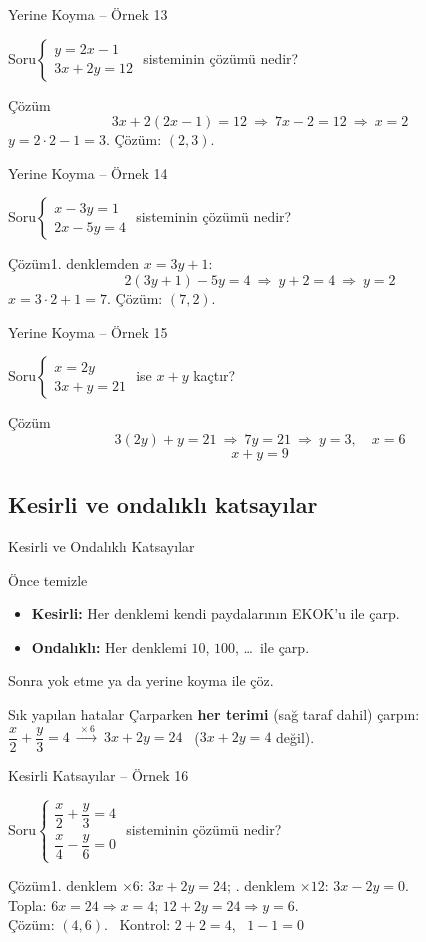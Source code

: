 \documentclass[aspectratio=169,11pt]{beamer}
\newcommand{\soru}[3]{%
\begin{frame}{#1}
  \begin{block}{Soru}\large #2\end{block}
  \pause
  \begin{exampleblock}{Çözüm}\large #3\end{exampleblock}
\end{frame}}
\begin{document}
\soru{Yerine Koyma -- Örnek 13}
{\(\begin{cases}y=2x-1\\ 3x+2y=12\end{cases}\) \quad sisteminin çözümü nedir?}
{\[3x+2(2x-1)=12\ \Rightarrow\ 7x-2=12\ \Rightarrow\ x=2\]
\(y=2\cdot 2-1=3\). \quad Çözüm: \((2,3)\).}

\soru{Yerine Koyma -- Örnek 14}
{\(\begin{cases}x-3y=1\\ 2x-5y=4\end{cases}\) \quad sisteminin çözümü nedir?}
{1. denklemden \(x=3y+1\):
\[2(3y+1)-5y=4\ \Rightarrow\ y+2=4\ \Rightarrow\ y=2\]
\(x=3\cdot 2+1=7\). \quad Çözüm: \((7,2)\).}

\soru{Yerine Koyma -- Örnek 15}
{\(\begin{cases}x=2y\\ 3x+y=21\end{cases}\) \quad ise \(x+y\) kaçtır?}
{\[3(2y)+y=21\ \Rightarrow\ 7y=21\ \Rightarrow\ y=3,\quad x=6\]
\[x+y=9\]}

\subsection{Kesirli ve ondalıklı katsayılar}
\begin{frame}{Kesirli ve Ondalıklı Katsayılar}
\begin{block}{Önce temizle}
\begin{itemize}
\item \textbf{Kesirli:} Her denklemi kendi paydalarının EKOK'u ile çarp.
\item \textbf{Ondalıklı:} Her denklemi \(10\), \(100\), \dots\ ile çarp.
\end{itemize}
Sonra yok etme ya da yerine koyma ile çöz.
\end{block}
\begin{alertblock}{Sık yapılan hatalar}
Çarparken \textbf{her terimi} (sağ taraf dahil) çarpın: \(\dfrac{x}{2}+\dfrac{y}{3}=4\ \xrightarrow{\ \times 6\ }\ 3x+2y=24\) \ (\(3x+2y=4\) değil).
\end{alertblock}
\end{frame}

\soru{Kesirli Katsayılar -- Örnek 16}
{\(\begin{cases}\dfrac{x}{2}+\dfrac{y}{3}=4\\[8pt] \dfrac{x}{4}-\dfrac{y}{6}=0\end{cases}\) \quad sisteminin çözümü nedir?}
{1. denklem \(\times 6\): \(3x+2y=24\); \quad 2. denklem \(\times 12\): \(3x-2y=0\).\\[3pt]
Topla: \(6x=24\Rightarrow x=4\); \quad \(12+2y=24\Rightarrow y=6\).\\[3pt]
Çözüm: \((4,6)\). \ Kontrol: \(2+2=4\), \ \(1-1=0\) \checkmark}
\end{document}
